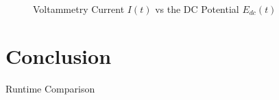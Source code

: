\documentclass{prettytex/ox/mmsc-special-topic}
\begin{document}
  \begin{figure}[H]
    \centering
    \caption{Voltammetry Current $I(t)$ vs the DC Potential $E_{dc}(t)$}
    \label{fig:voltammetry-current}
  \end{figure}

  \section{Conclusion}

  \begin{table}
    \caption{Runtime Comparison}
  \end{table}

  \pagebreak
  \printbibliography
  \printnoidxglossary[type=acronym]
\end{document}
